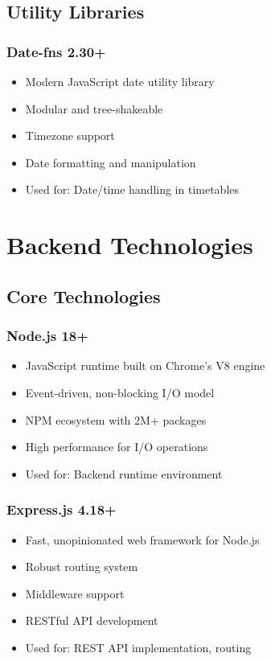 \subsection{Utility Libraries}

\subsubsection{Date-fns 2.30+}
\begin{itemize}[leftmargin=*]
    \item Modern JavaScript date utility library
    \item Modular and tree-shakeable
    \item Timezone support
    \item Date formatting and manipulation
    \item Used for: Date/time handling in timetables
\end{itemize}

\section{Backend Technologies}

\subsection{Core Technologies}

\subsubsection{Node.js 18+}
\begin{itemize}[leftmargin=*]
    \item JavaScript runtime built on Chrome's V8 engine
    \item Event-driven, non-blocking I/O model
    \item NPM ecosystem with 2M+ packages
    \item High performance for I/O operations
    \item Used for: Backend runtime environment
\end{itemize}

\subsubsection{Express.js 4.18+}
\begin{itemize}[leftmargin=*]
    \item Fast, unopinionated web framework for Node.js
    \item Robust routing system
    \item Middleware support
    \item RESTful API development
    \item Used for: REST API implementation, routing
\end{itemize}

